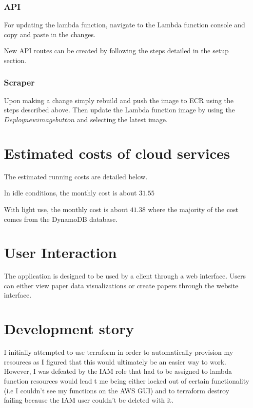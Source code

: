 \documentclass[12pt]{article}
\begin{document}
\subsubsection{API}

For updating the lambda function, navigate to the Lambda function console and copy and paste in the changes.

New API routes can be created by following the steps detailed in the setup section.

\subsubsection{Scraper}

Upon making a change simply rebuild and push the image to ECR using the steps described above. Then update the Lambda function image by using the $Deploy new image button$ and selecting the latest image.

\section{Estimated costs of cloud services}
The estimated running costs are detailed below.

In idle conditions, the monthly cost is about $31.55$

With light use, the monthly cost is about $41.38$ where the majority of the cost comes from the DynamoDB database.

\section{User Interaction}

The application is designed to be used by a client through a web interface. Users can either view paper data visualizations or create papers through the website interface. 


\section{Development story}

I initially attempted to use terraform in order to automatically provision my resourecs as I figured that this would ultimately be an easier way to work.
However, I was defeated by the IAM role that had to be assigned to lambda function resources would lead t me being either locked out of certain functionality (i.e I couldn't see my functions on the AWS GUI) and to terraform destroy failing because the IAM user couldn't be deleted with it.
\end{document}
